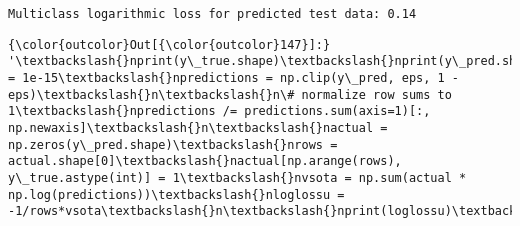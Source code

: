 \documentclass[11pt]{article}
\begin{document}
    \begin{Verbatim}[commandchars=\\\{\}]
Multiclass logarithmic loss for predicted test data: 0.14

    \end{Verbatim}

\begin{Verbatim}[commandchars=\\\{\}]
{\color{outcolor}Out[{\color{outcolor}147}]:} '\textbackslash{}nprint(y\_true.shape)\textbackslash{}nprint(y\_pred.shape)\textbackslash{}neps = 1e-15\textbackslash{}npredictions = np.clip(y\_pred, eps, 1 - eps)\textbackslash{}n\textbackslash{}n\# normalize row sums to 1\textbackslash{}npredictions /= predictions.sum(axis=1)[:, np.newaxis]\textbackslash{}n\textbackslash{}nactual = np.zeros(y\_pred.shape)\textbackslash{}nrows = actual.shape[0]\textbackslash{}nactual[np.arange(rows), y\_true.astype(int)] = 1\textbackslash{}nvsota = np.sum(actual * np.log(predictions))\textbackslash{}nloglossu = -1/rows*vsota\textbackslash{}n\textbackslash{}nprint(loglossu)\textbackslash{}n'
\end{Verbatim}
            
\end{document}
